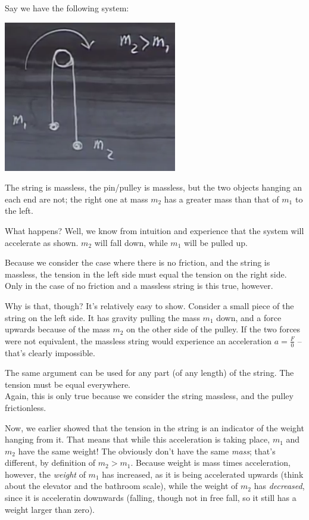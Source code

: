 \documentclass[12pt,a4paper]{report}
\begin{document}
Say we have the following system:

\begin{center}
\includegraphics[scale=0.8]{Graphics/lec7_pulley}
\end{center}

The string is massless, the pin/pulley is massless, but the two objects hanging an each end are not; the right one at mass $m_2$ has a greater mass than that of $m_1$ to the left.

What happens? Well, we know from intuition and experience that the system will accelerate as shown. $m_2$ will fall down, while $m_1$ will be pulled up.

Because we consider the case where there is no friction, and the string is massless, the tension in the left side must equal the tension on the right side. Only in the case of no friction and a massless string is this true, however.

Why is that, though? It's relatively easy to show. Consider a small piece of the string on the left side. It has gravity pulling the mass $m_1$ down, and a force upwards because of the mass $m_2$ on the other side of the pulley. If the two forces were not equivalent, the massless string would experience an acceleration $a = \frac{F}{0}$ -- that's clearly impossible.	

The same argument can be used for any part (of any length) of the string. The tension must be equal everywhere.\\
Again, this is only true because we consider the string massless, and the pulley frictionless.

Now, we earlier showed that the tension in the string is an indicator of the weight hanging from it. That means that while this acceleration is taking place, $m_1$ and $m_2$ have the same weight! The obviously don't have the same \emph{mass}; that's different, by definition of $m_2 > m_1$. Because weight is mass times acceleration, however, the \emph{weight} of $m_1$ has increased, as it is being accelerated upwards (think about the elevator and the bathroom scale), while the weight of $m_2$ has \emph{decreased}, since it is acceleratin downwards (falling, though not in free fall, so it still has a weight larger than zero).
\end{document}
